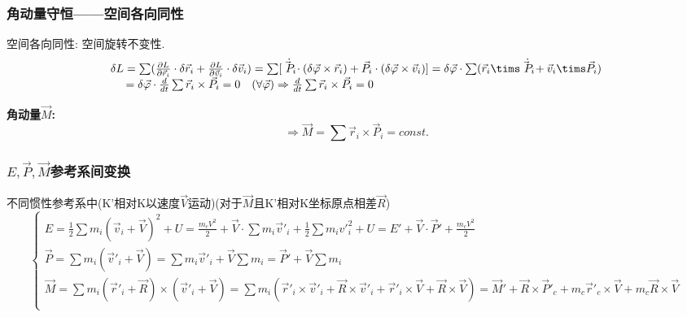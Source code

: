 \documentclass{article}
\begin{document}
    \subsubsection{角动量守恒——空间各向同性}
        空间各向同性: 空间旋转不变性.
            \begin{displaymath}
            \begin{array}{ll}
            \delta L = \sum (\frac{\partial L}{\partial \vec r_i} \cdot \delta \vec r_i + \frac{\partial L}{\partial \vec v_i} \cdot \delta \vec v_i) = \sum [\dot{\vec P_i} \cdot (\delta \vec \varphi \times \vec r_i) + \vec P_i \cdot ( \delta \vec \varphi \times \vec v_i )]
             = \delta \vec \varphi \cdot \sum (\vec r_i \tims \dot{\vec P_i} + \vec v_i \tims \vec P_i) \\
             \quad\  = \delta \vec \varphi \cdot \frac{d}{dt} \sum \vec r_i \times \vec P_i = 0\quad(\forall \vec \varphi) \Rightarrow \frac{d}{dt}\sum \vec r_i \times \vec P_i = 0
            \end{array}
            \end{displaymath}
        
        \textbf{角动量$\vec M$: }
            $$\Rightarrow \vec M = \sum \vec r_i \times \vec P_i = const.$$


    \subsubsection{$E,\vec P,\vec M$参考系间变换}
        不同惯性参考系中(K'相对K以速度$\vec V$运动)(对于$\vec M$且K'相对K坐标原点相差$\vec R$)\\
            \begin{displaymath}
                \left\{ \begin{array}{ll}
                E = \frac{1}{2} \sum m_i(\vec v_i + \vec V)^2 + U = \frac{m_c V^2}{2} + \vec V \cdot \sum m_i \vec v'_i + \frac{1}{2} \sum m_i v'_i^2 + U = E' + \vec V \cdot \vec P' + \frac{m_c V^2}{2}\\
                \vec P = \sum m_i (\vec v'_i + \vec V) = \sum m_i \vec v'_i + \vec V \sum m_i = \vec P' + \vec V \sum m_i\\
                \vec M = \sum m_i (\vec r'_i + \vec R) \times (\vec v'_i + \vec V) = \sum m_i( \vec r'_i \times \vec v'_i +  \vec R \times \vec v'_i + \vec r'_i \times \vec V + \vec R \times \vec V)
             = \vec M' + \vec R \times \vec P'_c + m_c \vec r'_c \times \vec V + m_c \vec R \times \vec V\\
                \end{array} \right.
            \end{displaymath}
\end{document}
